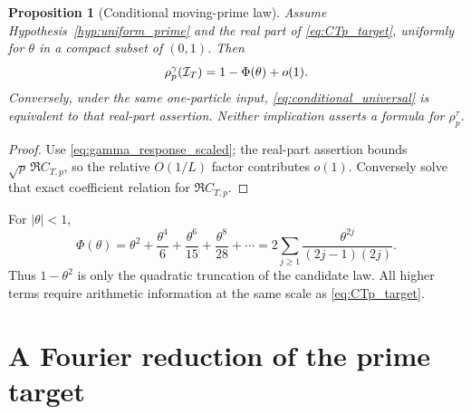 \documentclass[11pt,reqno]{amsart}
\theoremstyle{plain}\newtheorem{theorem}{Theorem}[section]\newtheorem{proposition}[theorem]{Proposition}\newtheorem{lemma}[theorem]{Lemma}\newtheorem{corollary}[theorem]{Corollary}
\theoremstyle{definition}\newtheorem{hypothesis}[theorem]{Hypothesis}\newtheorem{definition}[theorem]{Definition}
\theoremstyle{remark}\newtheorem{remark}[theorem]{Remark}\newtheorem{experiment}[theorem]{Experiment}\newtheorem{question}[theorem]{Question}\newtheorem{heuristic}[theorem]{Heuristic}\newtheorem{conjecture}[theorem]{Conjecture}
\begin{document}
\begin{proposition}[Conditional moving-prime law]\label{prop:conditional_universal}
Assume Hypothesis~\ref{hyp:uniform_prime} and the real part of \eqref{eq:CTp_target}, uniformly for $\theta$ in a compact subset of $(0,1)$. Then
\begin{equation}
 \rho_p^\gamma(\mathcal I_T)=1-\Phi(\theta)+o(1).
 \label{eq:conditional_universal}
\end{equation}
Conversely, under the same one-particle input, \eqref{eq:conditional_universal} is equivalent to that real-part assertion. Neither implication asserts a formula for $\rho_p^\tau$.
\end{proposition}
\begin{proof}
Use \eqref{eq:gamma_response_scaled}; the real-part assertion bounds $\sqrt p\,\Re C_{T,p}$, so the relative $O(1/L)$ factor contributes $o(1)$. Conversely solve that exact coefficient relation for $\Re C_{T,p}$.
\end{proof}
For $|\theta|<1$,
\begin{equation}
 \Phi(\theta)=\theta^2+\frac{\theta^4}{6}+\frac{\theta^6}{15}
                    +\frac{\theta^8}{28}+\cdots
 =2\sum_{j\ge1}\frac{\theta^{2j}}{(2j-1)(2j)}.
 \label{eq:Phi_series}
\end{equation}
Thus $1-\theta^2$ is only the quadratic truncation of the candidate law. All higher terms require arithmetic information at the same scale as \eqref{eq:CTp_target}.

\section{A Fourier reduction of the prime target}
\label{sec:Fourier_reduction}
\end{document}
